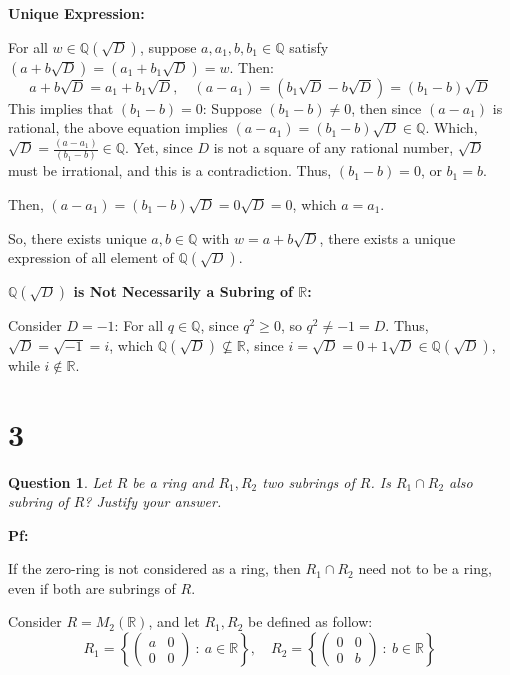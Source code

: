 \documentclass{article}
\newtheorem{question}{Question}
\begin{document}
\hfill

\textbf{Unique Expression:}

For all $w\in\mathbb{Q}(\sqrt{D})$, suppose $a,a_1,b,b_1\in\mathbb{Q}$ satisfy $(a+b\sqrt{D})=(a_1+b_1\sqrt{D})=w$. Then:
$$a+b\sqrt{D}=a_1+b_1\sqrt{D},\quad (a-a_1)=(b_1\sqrt{D}-b\sqrt{D}) = (b_1-b)\sqrt{D}$$
This implies that $(b_1-b)=0$: Suppose $(b_1-b)\neq 0$, then since $(a-a_1)$ is rational, the above equation implies $(a-a_1)=(b_1-b)\sqrt{D}\in\mathbb{Q}$.
Which, $\sqrt{D}=\frac{(a-a_1)}{(b_1-b)}\in\mathbb{Q}$. Yet, since $D$ is not a square of any rational number, $\sqrt{D}$ must be irrational, 
and this is a contradiction. Thus, $(b_1-b)=0$, or $b_1=b$.

Then, $(a-a_1)=(b_1-b)\sqrt{D} = 0\sqrt{D} = 0$, which $a=a_1$.

So, there exists unique $a,b\in\mathbb{Q}$ with $w=a+b\sqrt{D}$, there exists a unique expression of all element of $\mathbb{Q}(\sqrt{D})$.

\hfill

\textbf{$\mathbb{Q}(\sqrt{D})$ is Not Necessarily a Subring of $\mathbb{R}$:}

Consider $D=-1$: For all $q\in\mathbb{Q}$, since $q^2 \geq 0$, so $q^2\neq -1=D$. Thus, $\sqrt{D}=\sqrt{-1}=i$, which $\mathbb{Q}(\sqrt{D}) \not\subseteq \mathbb{R}$,
since $i = \sqrt{D} = 0+1\sqrt{D} \in \mathbb{Q}(\sqrt{D})$, while $i\notin \mathbb{R}$.

\break

\section*{3}
\begin{question}
    Let $R$ be a ring and $R_1,R_2$ two subrings of $R$. Is $R_1\cap R_2$ also subring of $R$? Justify your answer.
\end{question}

\textbf{Pf:}

If the zero-ring is not considered as a ring, then $R_1\cap R_2$ need not to be a ring, even if both are subrings of $R$.

Consider $R = M_2(\mathbb{R})$, and let $R_1,R_2$ be defined as follow:
$$R_1 = \left\{\begin{pmatrix}
    a&0\\0&0
\end{pmatrix}\ :\ a\in\mathbb{R}\right\},\quad R_2=\left\{\begin{pmatrix}
    0&0\\0&b
\end{pmatrix}\ :\ b\in\mathbb{R}\right\}$$
\end{document}
